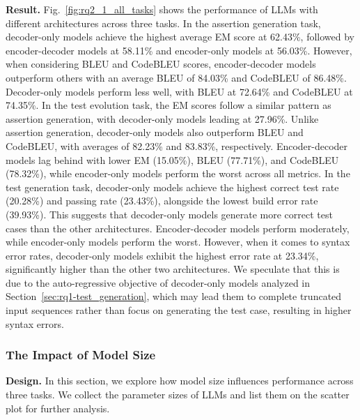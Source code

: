 \textbf{Result.}
Fig.~\ref{fig:rq2_1_all_tasks} shows the performance of LLMs with different architectures across three tasks. 
In the assertion generation task, decoder-only models achieve the highest average EM score at 62.43\%, followed by encoder-decoder models at 58.11\% and encoder-only models at 56.03\%. However, when considering BLEU and CodeBLEU scores, encoder-decoder models outperform others with an average BLEU of 84.03\% and CodeBLEU of 86.48\%. Decoder-only models perform less well, with BLEU at 72.64\% and CodeBLEU at 74.35\%.
In the test evolution task, the EM scores follow a similar pattern as assertion generation, with decoder-only models leading at 27.96\%. Unlike assertion generation, decoder-only models also outperform BLEU and CodeBLEU, with averages of 82.23\% and 83.83\%, respectively. Encoder-decoder models lag behind with lower EM (15.05\%), BLEU (77.71\%), and CodeBLEU (78.32\%), while encoder-only models perform the worst across all metrics.
In the test generation task, decoder-only models achieve the highest correct test rate (20.28\%) and passing rate (23.43\%), alongside the lowest build error rate (39.93\%). This suggests that decoder-only models generate more correct test cases than the other architectures. Encoder-decoder models perform moderately, while encoder-only models perform the worst. However, when it comes to syntax error rates, decoder-only models exhibit the highest error rate at 23.34\%, significantly higher than the other two architectures. We speculate that this is due to the auto-regressive objective of decoder-only models analyzed in Section~\ref{sec:rq1-test_generation}, which may lead them to complete truncated input sequences rather than focus on generating the test case, resulting in higher syntax errors.



\subsubsection{The Impact of Model Size}

\textbf{Design.}
In this section, we explore how model size influences performance across three tasks. We collect the parameter sizes of LLMs and list them on the scatter plot for further analysis.



